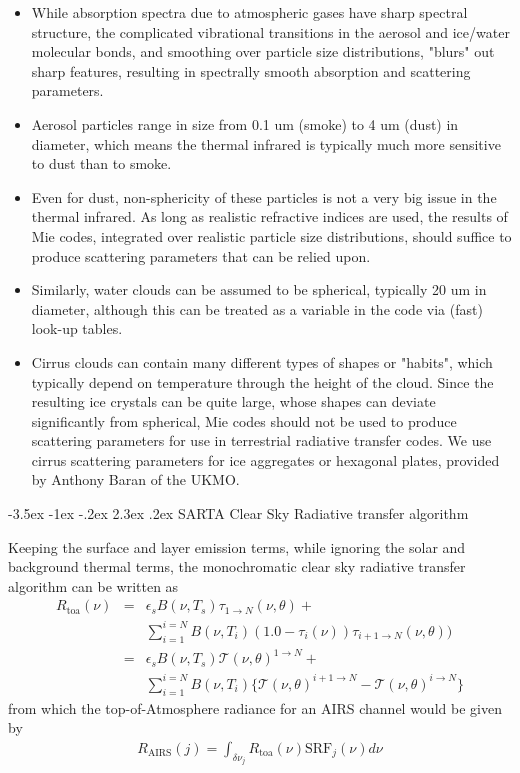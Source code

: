 \documentclass[11pt]{article}
\makeatletter
\renewcommand{\section}{\@startsection {section}{1}{\z@}%
                                   {-3.5ex \@plus -1ex \@minus -.2ex}%
                                   {2.3ex \@plus.2ex}%
                                   {\reset@font\large\bfseries}}
\makeatother
\begin{document}
\begin{itemize}
\item While absorption spectra due to atmospheric gases have sharp
  spectral structure, the complicated vibrational transitions in the
  aerosol and ice/water molecular bonds, and smoothing over particle
  size distributions, "blurs" out sharp features, resulting in
  spectrally smooth absorption and scattering parameters.
\item Aerosol particles range in size from 0.1 um (smoke) to 4 um
  (dust) in diameter, which means the thermal infrared is typically
  much more sensitive to dust than to smoke.
\item Even for dust, non-sphericity of these particles is not a very
  big issue in the thermal infrared.  As long as realistic refractive
  indices are used, the results of Mie codes, integrated over
  realistic particle size distributions, should suffice to produce
  scattering parameters that can be relied upon.
\item Similarly, water clouds can be assumed to be spherical,
  typically 20 um in diameter, although this can be treated as a
  variable in the code via (fast) look-up tables.
\item Cirrus clouds can contain many different types of shapes or
  "habits", which typically depend on temperature through the height
  of the cloud. Since the resulting ice crystals can be quite large,
  whose shapes can deviate significantly from spherical, Mie codes
  should not be used to produce scattering parameters for use in
  terrestrial radiative transfer codes.  We use cirrus scattering
  parameters for ice aggregates or hexagonal plates, provided by
  Anthony Baran of the UKMO.
\end{itemize}

\section{SARTA Clear Sky Radiative transfer algorithm}

Keeping the surface and layer emission terms, while ignoring the solar
and background thermal terms, the monochromatic clear sky radiative
transfer algorithm can be written as
\begin{eqnarray*}
  R_{\text{toa}}(\nu) & = & \epsilon_{s} B(\nu,T_{s}) \tau_{1 \rightarrow N}(\nu,\theta) + \\
  &   &  \sum_{i=1}^{i=N} B(\nu,T_{i})
  (1.0 - \tau_{i}(\nu)) \tau_{i+1 \rightarrow N}(\nu,\theta)) \\
  & = & \epsilon_{s} B(\nu,T_{s}) \mathcal{T}(\nu,\theta)^{1 \rightarrow N} + \\
  &   &  \sum_{i=1}^{i=N} B(\nu,T_{i}) \{ \mathcal{T}(\nu,\theta)^{i+1\rightarrow N} - 
  \mathcal{T}(\nu,\theta)^{i \rightarrow N} \}
\end{eqnarray*}
from which the top-of-Atmosphere radiance for an AIRS channel would be
given by
\begin{eqnarray*}
  R_{\text{AIRS}}(j) = \int_{\delta \nu_{j}} R_{\text{toa}}(\nu) \text{SRF}_{j}(\nu) d\nu
\end{eqnarray*}
\end{document}
